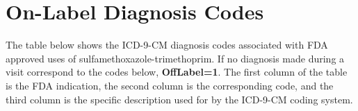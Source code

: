 \section{On-Label Diagnosis Codes}
The table below shows the ICD-9-CM diagnosis codes associated with FDA approved uses of sulfamethoxazole-trimethoprim. If no diagnosis made during a visit correspond to the codes below, \textbf{OffLabel=1}. The first column of the table is the FDA indication, the second column is the corresponding code, and the third column is the specific description used for by the ICD-9-CM coding system.


